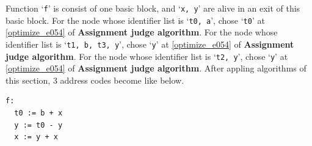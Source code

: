 \begin{Example}
\begin{figure}[htbp]
\end{figure}
Function `{\tt{f}}' is consist of one basic block, and 
`{\tt{x, y}}' are alive in an exit of this basic block.
For the node whose identifier list is `{\tt{t0, a}}',
chose `{\tt{t0}}' at \ref{optimize_e054} of {\bf Assignment judge algorithm}.
For the node whose identifier list is `{\tt{t1, b, t3, y}}',
chose `{\tt{y}}' at \ref{optimize_e054} of {\bf Assignment judge algorithm}.
For the node whose identifier list is `{\tt{t2, y}}',
chose `{\tt{y}}' at \ref{optimize_e054} of {\bf Assignment judge algorithm}.
After appling algorithms of this section,
3 address codes become like below.
\begin{verbatim}
f:
  t0 := b + x
  y := t0 - y
  x := y + x
\end{verbatim}
\end{Example}

